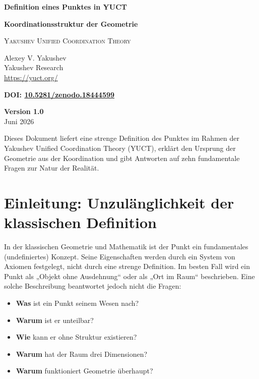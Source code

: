 \documentclass[12pt,a4paper]{article}
\begin{document}
	
	\begin{titlepage}
		\begin{center}
			\vspace*{1.5cm}
			\Huge\textbf{Definition eines Punktes in YUCT}
			
			\vspace{0.3cm}
			\Large\textbf{Koordinationsstruktur der Geometrie}
			
			\vspace{0.5cm}
			\large
			\textsc{Yakushev Unified Coordination Theory}
			
			\vspace{0.8cm}
			\large
			Alexey V. Yakushev \\
			Yakushev Research \\
			\url{https://yuct.org/}
			
			\vspace{0.5cm}
			\large
			\textbf{DOI: \href{https://doi.org/10.5281/zenodo.18444599}{10.5281/zenodo.18444599}}
			
			\vspace{1.5cm}
			\large
			\textbf{Version 1.0} \\
			Juni 2026
			
			\vfill
			\normalsize
			Dieses Dokument liefert eine strenge Definition des Punktes im Rahmen der Yakushev Unified Coordination Theory (YUCT),
			erklärt den Ursprung der Geometrie aus der Koordination und gibt Antworten auf zehn fundamentale Fragen zur Natur der Realität.
		\end{center}
	\end{titlepage}
	
	\tableofcontents
	\newpage
	
	\section{Einleitung: Unzulänglichkeit der klassischen Definition}
	
	In der klassischen Geometrie und Mathematik ist der Punkt ein fundamentales (undefiniertes) Konzept. Seine Eigenschaften werden durch ein System von Axiomen festgelegt, nicht durch eine strenge Definition. Im besten Fall wird ein Punkt als „Objekt ohne Ausdehnung“ oder als „Ort im Raum“ beschrieben. Eine solche Beschreibung beantwortet jedoch nicht die Fragen:
	
	\begin{itemize}
		\item \textbf{Was} ist ein Punkt seinem Wesen nach?
		\item \textbf{Warum} ist er unteilbar?
		\item \textbf{Wie} kann er ohne Struktur existieren?
		\item \textbf{Warum} hat der Raum drei Dimensionen?
		\item \textbf{Warum} funktioniert Geometrie überhaupt?
	\end{itemize}
	
\end{document}
